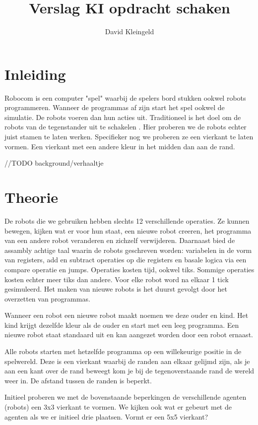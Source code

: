 \documentclass[10pt]{article}
\author{David Kleingeld}
\title{Verslag KI opdracht schaken }
\begin{document}

\maketitle

\section{Inleiding}

Robocom is een computer "spel" waarbij de spelers bord stukken ookwel robots programmeren. Wanneer de programmas af zijn start het spel ookwel de simulatie. De robots voeren dan hun acties uit. Traditioneel is het doel om de robots van de tegenstander uit te schakelen \cite{robocom}. Hier proberen we de robots echter juist stamen te laten werken. Specifieker nog we proberen ze een vierkant te laten vormen. Een vierkant met een andere kleur in het midden dan aan de rand.

//TODO background/verhaaltje

\section{Theorie}

De robots die we gebruiken hebben slechts 12 verschillende operaties. Ze kunnen bewegen, kijken wat er voor hun staat, een nieuwe robot creeren, het programma van een andere robot veranderen en zichzelf verwijderen. Daarnaast bied de assambly achtige taal waarin de robots geschreven worden: variabelen in de vorm van registers, add en subtract operaties op die registers en basale logica via een compare operatie en jumps. Operaties kosten tijd, ookwel tiks. Sommige operaties kosten echter meer tiks dan andere. Voor elke robot word na elkaar 1 tick gesimuleerd. Het maken van nieuwe robots is het duurst gevolgt door het overzetten van programmas.

Wanneer een robot een nieuwe robot maakt noemen we deze ouder en kind. Het kind krijgt dezelfde kleur als de ouder en start met een leeg programma. Een nieuwe robot staat standaard uit en kan aangezet worden door een robot ernaast. 

Alle robots starten met hetzelfde programma op een willekeurige positie in de spelwereld. Deze is een vierkant waarbij de randen aan elkaar gelijmd zijn, als je aan een kant over de rand beweegt kom je bij de tegenoverstaande rand de wereld weer in. De afstand tussen de randen is beperkt.

Initieel proberen we met de bovenstaande beperkingen de verschillende agenten (robots) een 3x3 vierkant te vormen. We kijken ook wat er gebeurt met de agenten als we er initieel drie plaatsen. Vormt er een 5x5 vierkant? 
\end{document}
